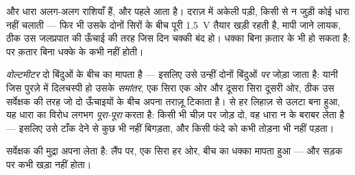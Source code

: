 \begin{proposition}[धारा के बिना भी विभवांतर]\label{prop:g8:voltage-voltmeter:nocurrent}
 और धारा अलग-अलग राशियाँ हैं, और  पहले आता है। दराज़
में अकेली पड़ी, किसी से न जुड़ी  कोई धारा नहीं चलाती --- फिर भी
उसके दोनों सिरों के बीच पूरी \qty{1.5}{V} तैयार खड़ी रहती है, मापी
जाने लायक, ठीक उस जलप्रपात की ऊँचाई की तरह जिस दिन चक्की बंद हो।
धक्का बिना क़तार के भी हो सकता है; पर क़तार बिना धक्के के कभी नहीं
होती।
\end{proposition}

\begin{definition}[वोल्टमीटर]\label{def:g8:voltage-voltmeter:voltmeter}
\emph{वोल्टमीटर} दो बिंदुओं के बीच का  मापता
है --- इसलिए उसे उन्हीं दोनों बिंदुओं \emph{पर} जोड़ा जाता है: यानी
जिस पुरज़े में दिलचस्पी हो उसके \emph{समांतर}, एक सिरा एक ओर और दूसरा
सिरा दूसरी ओर, ठीक उस सर्वेक्षक की तरह जो दो ऊँचाइयों के बीच अपना
तराज़ू टिकाता है।  से हर लिहाज़ से उलटा बना हुआ, यह धारा का विरोध
लगभग \emph{पूरा-पूरा} करता है: किसी भी चीज़ पर जोड़ दो, वह धारा
न के बराबर लेता है --- इसलिए उसे टाँक देने से कुछ भी नहीं बिगड़ता, और
किसी फंदे को कभी तोड़ना भी नहीं पड़ता।
\end{definition}

\begin{omfigure}

{\small {} सर्वेक्षक की मुद्रा अपना लेता है: लैंप पर, एक सिरा
हर ओर, बीच का धक्का मापता हुआ --- और सड़क पर कभी खड़ा नहीं होता।}
\end{omfigure}

